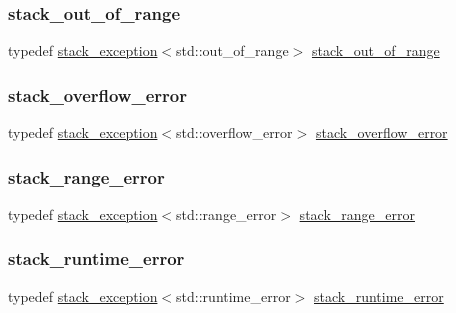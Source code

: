 \subsubsection{\texorpdfstring{stack\+\_\+out\+\_\+of\+\_\+range}{stack\_out\_of\_range}}
{\footnotesize\ttfamily typedef \mbox{\hyperlink{classstacktrace_1_1stack__exception}{stack\+\_\+exception}}$<$std\+::out\+\_\+of\+\_\+range$>$ \mbox{\hyperlink{namespacestacktrace_a34ce6236709f71cf3c8464d9c1ba759e}{stack\+\_\+out\+\_\+of\+\_\+range}}}

\mbox{\label{namespacestacktrace_aac4efddfe0896c669f9c51ea526b3826}} 
\subsubsection{\texorpdfstring{stack\+\_\+overflow\+\_\+error}{stack\_overflow\_error}}
{\footnotesize\ttfamily typedef \mbox{\hyperlink{classstacktrace_1_1stack__exception}{stack\+\_\+exception}}$<$std\+::overflow\+\_\+error$>$ \mbox{\hyperlink{namespacestacktrace_aac4efddfe0896c669f9c51ea526b3826}{stack\+\_\+overflow\+\_\+error}}}

\mbox{\label{namespacestacktrace_ae0f1c03cd8a7ed8fb41381a04825aaf7}} 
\subsubsection{\texorpdfstring{stack\+\_\+range\+\_\+error}{stack\_range\_error}}
{\footnotesize\ttfamily typedef \mbox{\hyperlink{classstacktrace_1_1stack__exception}{stack\+\_\+exception}}$<$std\+::range\+\_\+error$>$ \mbox{\hyperlink{namespacestacktrace_ae0f1c03cd8a7ed8fb41381a04825aaf7}{stack\+\_\+range\+\_\+error}}}

\mbox{\label{namespacestacktrace_a79b82ab6e60429fbb295122c4e740d83}} 
\subsubsection{\texorpdfstring{stack\+\_\+runtime\+\_\+error}{stack\_runtime\_error}}
{\footnotesize\ttfamily typedef \mbox{\hyperlink{classstacktrace_1_1stack__exception}{stack\+\_\+exception}}$<$std\+::runtime\+\_\+error$>$ \mbox{\hyperlink{namespacestacktrace_a79b82ab6e60429fbb295122c4e740d83}{stack\+\_\+runtime\+\_\+error}}}



